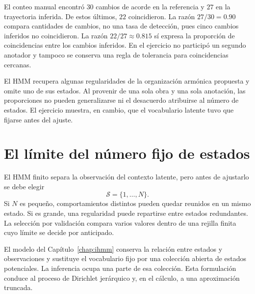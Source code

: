 El conteo manual encontró $30$ cambios de acorde en la referencia y $27$ en la trayectoria inferida. De estos últimos, $22$ coincidieron. La razón $27/30=0.90$ compara cantidades de cambios, no una tasa de detección, pues cinco cambios inferidos no coincidieron. La razón $22/27\approx0.815$ sí expresa la proporción de coincidencias entre los cambios inferidos. En el ejercicio no participó un segundo anotador y tampoco se conserva una regla de tolerancia para coincidencias cercanas.

El HMM recupera algunas regularidades de la organización armónica propuesta y omite uno de sus estados. Al provenir de una sola obra y una sola anotación, las proporciones no pueden generalizarse ni el desacuerdo atribuirse al número de estados. El ejercicio muestra, en cambio, que el vocabulario latente tuvo que fijarse antes del ajuste.

\section{El límite del número fijo de estados}

El HMM finito separa la observación del contexto latente, pero antes de ajustarlo se debe elegir
\[
\mathcal{S}=\{1,\ldots,N\}.
\]
Si $N$ es pequeño, comportamientos distintos pueden quedar reunidos en un mismo estado. Si es grande, una regularidad puede repartirse entre estados redundantes. La selección por validación compara varios valores dentro de una rejilla finita cuyo límite se decide por anticipado.

El modelo del Capítulo~\ref{chap:ihmm} conserva la relación entre estados y observaciones y sustituye el vocabulario fijo por una colección abierta de estados potenciales. La inferencia ocupa una parte de esa colección. Esta formulación conduce al proceso de Dirichlet jerárquico y, en el cálculo, a una aproximación truncada.
